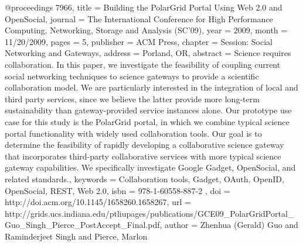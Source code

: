 @proceedings {7966,
	title = {Building the PolarGrid Portal Using Web 2.0 and OpenSocial},
	journal = {The International Conference for High Performance Computing, Networking, Storage and Analysis (SC{\textquoteright}09)},
	year = {2009},
	month = {11/20/2009},
	pages = {5},
	publisher = {ACM Press},
	chapter = {Session: Social Networking and Gateways},
	address = {Porland, OR},
	abstract = {Science requires collaboration. In this paper, we investigate the feasibility of coupling current social networking techniques to science gateways to provide a scientific collaboration model. We are particularly interested in the integration of local and third party services, since we believe the latter provide more long-term sustainability than gateway-provided service instances alone. Our prototype use case for this study is the PolarGrid portal, in which we combine typical science portal functionality with widely used collaboration tools. Our goal is to determine the feasibility of rapidly developing a collaborative science gateway that incorporates third-party collaborative services with more typical science gateway capabilities. We specifically investigate Google Gadget, OpenSocial, and related standards.},
	keywords = {Collaboration tools, Gadget, OAuth, OpenID, OpenSocial, REST, Web 2.0},
	isbn = {978-1-60558-887-2 },
	doi = {http://doi.acm.org/10.1145/1658260.1658267},
	url = {http://grids.ucs.indiana.edu/ptliupages/publications/GCE09_PolarGridPortal_Guo_Singh_Pierce_PostAccept_Final.pdf},
	author = {Zhenhua (Gerald) Guo and Raminderjeet Singh and Pierce, Marlon}
}
